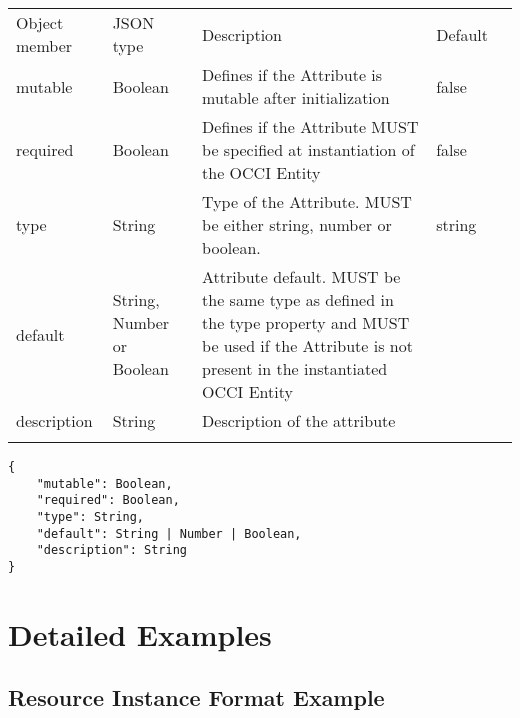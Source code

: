 \documentclass[10pt,a4paper]{article}
\begin{document}
 {
    \begin{tabularx}{\textwidth}{llXll}
    \toprule
    Object member & JSON type & Description & Default \\
    \colrule
    mutable & Boolean & Defines if the Attribute is mutable after initialization
& false \\

    required & Boolean & Defines if the Attribute MUST be specified at
instantiation of the OCCI Entity & false \\

    type & String & Type of the Attribute. MUST be either string, number or
boolean. & string \\


    default & String, Number or Boolean & Attribute default. MUST be the same
type as defined in the type property and MUST  be used if the Attribute is not
present in the instantiated OCCI Entity & \\

    description & String & Description of the attribute & \\
    \botrule
    \end{tabularx}
}
\begin{lstlisting}
{
    "mutable": Boolean,
    "required": Boolean,
    "type": String,
    "default": String | Number | Boolean,
    "description": String
}
\end{lstlisting}

\section{Detailed Examples}
\label{sec:examples}


\subsection{Resource Instance Format Example}
\label{sec:example_resource}
\end{document}
